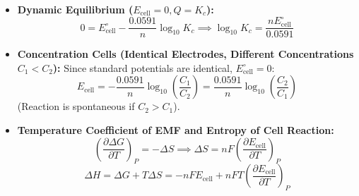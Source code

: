 \documentclass[10pt,twoside,openright]{book}
\begin{document}
\begin{formulabox}
\begin{itemize}
  \item \textbf{Dynamic Equilibrium ($E_{\text{cell}} = 0, Q = K_c$):}
  \begin{equation}
    0 = E_{\text{cell}}^\circ - \frac{0.0591}{n}\log_{10} K_c \implies \log_{10} K_c = \frac{n E_{\text{cell}}^\circ}{0.0591}
  \end{equation}
  \item \textbf{Concentration Cells (Identical Electrodes, Different Concentrations $C_1 < C_2$):}
  Since standard potentials are identical, $E_{\text{cell}}^\circ = 0$:
  \begin{equation}
    E_{\text{cell}} = -\frac{0.0591}{n}\log_{10}\left(\frac{C_1}{C_2}\right) = \frac{0.0591}{n}\log_{10}\left(\frac{C_2}{C_1}\right)
  \end{equation}
  (Reaction is spontaneous if $C_2 > C_1$).
  \item \textbf{Temperature Coefficient of EMF and Entropy of Cell Reaction:}
  \begin{equation}
    \left(\frac{\partial \Delta G}{\partial T}\right)_P = -\Delta S \implies \Delta S = n F \left(\frac{\partial E_{\text{cell}}}{\partial T}\right)_P
  \end{equation}
  \begin{equation}
    \Delta H = \Delta G + T \Delta S = -n F E_{\text{cell}} + n F T \left(\frac{\partial E_{\text{cell}}}{\partial T}\right)_P
  \end{equation}
\end{itemize}
\end{formulabox}
\end{document}
